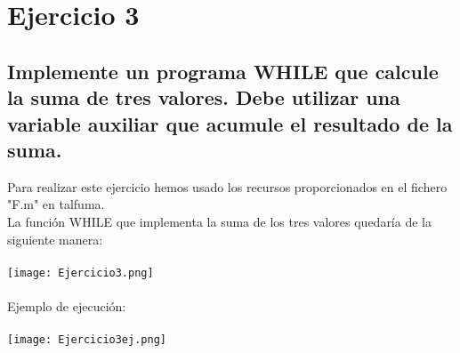 \documentclass{article}
\begin{document}
\section*{Ejercicio 3}
\subsection*{Implemente un programa WHILE que calcule la suma de tres valores. Debe utilizar una variable auxiliar que acumule el resultado de la suma.}
Para realizar este ejercicio hemos usado los recursos proporcionados en el fichero "F.m" en talfuma.
\\La función WHILE que implementa la suma de los tres valores quedaría de la siguiente manera:
\\
\\ \texttt{[image: Ejercicio3.png]}
\\
\\ Ejemplo de ejecución:
\\
\\ \texttt{[image: Ejercicio3ej.png]}
\end{document}
